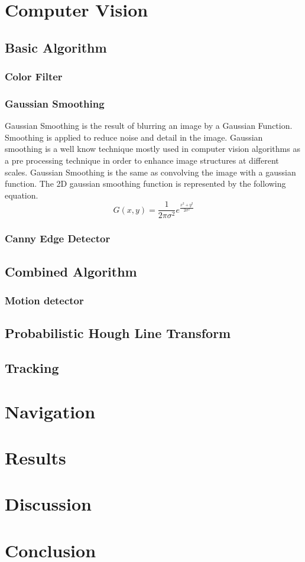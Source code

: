 \documentclass[a4paper]{article}
\begin{document}
\section{Computer Vision}
\subsection{Basic Algorithm}
\subsubsection{Color Filter}
\subsubsection{Gaussian Smoothing}
Gaussian Smoothing is the result of blurring an image by a Gaussian Function. Smoothing is applied to reduce noise and detail in the image. Gaussian smoothing is a well know technique mostly used in computer vision algorithms as a pre processing technique in order to enhance image structures at different scales. Gaussian Smoothing is the same as convolving the image with a gaussian function. The 2D gaussian smoothing function is represented by the following equation.
\begin{equation}
G(x,y) = \frac{1}{2\pi\sigma^2}e^{\frac{x^2 + y^2}{2\sigma^2}}
\end{equation}
\subsubsection{Canny Edge Detector}
\subsection{Combined Algorithm}
\subsubsection{Motion detector}
\subsection{Probabilistic Hough Line Transform}
\subsection{Tracking}

\section{Navigation}

\section{Results}

\section{Discussion}

\section{Conclusion}
\end{document}
